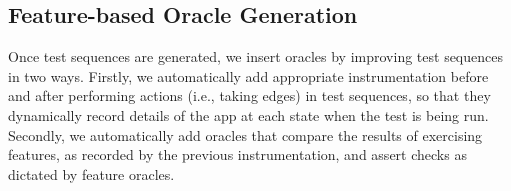 \subsection{Feature-based Oracle Generation}
\label{sec:oracle}


Once test sequences are generated, we insert oracles by improving test sequences in two ways.
Firstly, we automatically add appropriate instrumentation before and after performing actions (i.e., taking edges) in test sequences, so that they dynamically record details of the app at each state when the test is being run.
Secondly, we automatically add oracles that compare the results of exercising features, as recorded by the previous instrumentation, and assert checks as dictated by feature oracles.

